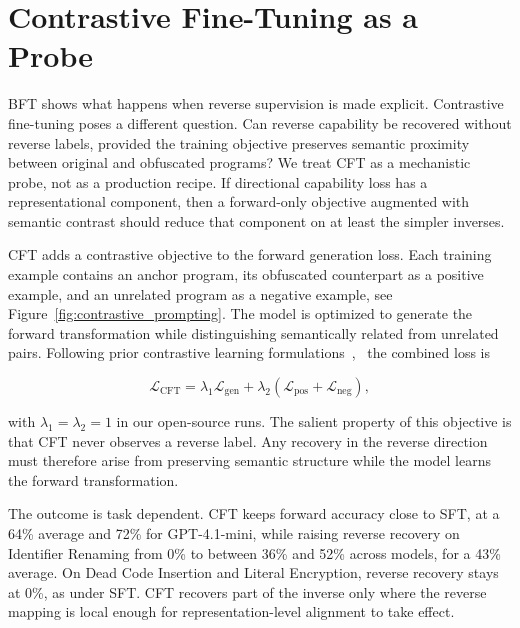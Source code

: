 \section{Contrastive Fine-Tuning as a Probe}
\label{contrastive}


BFT shows what happens when reverse supervision is made explicit. Contrastive
fine-tuning poses a different question. Can reverse capability be recovered
without reverse labels, provided the training objective preserves semantic
proximity between original and obfuscated programs? We treat CFT as a mechanistic
probe, not as a production recipe. If directional capability loss has a
representational component, then a forward-only objective augmented with semantic
contrast should reduce that component on at least the simpler inverses.



CFT adds a contrastive objective to the forward generation loss. Each training
example contains an anchor program, its obfuscated counterpart as a positive
example, and an unrelated program as a negative example, see Figure~\ref{fig:contrastive_prompting}. The model is optimized
to generate the forward transformation while distinguishing semantically related
from unrelated pairs. Following prior contrastive learning formulations~\cite{chen2020simple,
he2020momentum},~\cite{jain2021contracode, li2022coderetriever} the combined loss is

\begin{equation}
\mathcal{L}_{\text{CFT}} = \lambda_1 \mathcal{L}_{\text{gen}} + \lambda_2(\mathcal{L}_{\text{pos}} + \mathcal{L}_{\text{neg}}),
\end{equation}

with $\lambda_1 = \lambda_2 = 1$ in our open-source runs. The salient property of
this objective is that CFT never observes a reverse label. Any recovery in the
reverse direction must therefore arise from preserving semantic structure while
the model learns the forward transformation.





The outcome is task dependent. CFT keeps forward accuracy close to SFT, at a 64\%
average and 72\% for GPT-4.1-mini, while raising reverse recovery on Identifier
Renaming from 0\% to between 36\% and 52\% across models, for a 43\% average. On
Dead Code Insertion and Literal Encryption, reverse recovery stays at 0\%, as
under SFT. CFT recovers part of the inverse only where the reverse mapping is
local enough for representation-level alignment to take effect.

